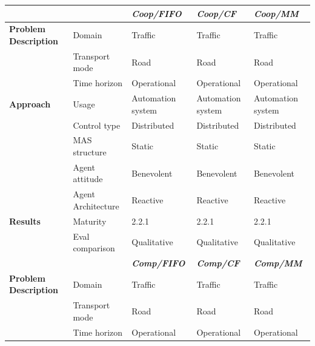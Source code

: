 \documentclass[11pt,letterpaper,onecolumn,twoside,openright,final]{report}
\begin{document}
\begin{table}[htbp]
\centering
\begin{tabular}{p{}p{}p{}p{}p{}}
    \addlinespace
        &       & \emph{\textbf{Coop/FIFO}} & \emph{\textbf{Coop/CF}} & \emph{\textbf{Coop/MM}} \\[0.2ex]
        \hline\hline
        \begin{minipage}[t]{2.3cm}\textbf{Problem \newline Description}\end{minipage} & Domain & Traffic & Traffic & Traffic \\
        \cline{2-5} & Transport mode & Road  & Road  & Road \\
        \cline{2-5} & Time horizon & Operational & Operational & Operational \\
        \hline
        \textbf{Approach} & Usage & Automation system & Automation system & Automation system \\
        \cline{2-5} & Control type & Distributed & Distributed & Distributed \\
        \cline{2-5} & MAS structure & Static & Static & Static \\
        \cline{2-5} & Agent attitude & Benevolent & Benevolent & Benevolent \\
        \cline{2-5} & \begin{minipage}[t]{2.3cm}Agent \newline Architecture\end{minipage} & Reactive & Reactive & Reactive \\[2.5ex]
        \hline
        \textbf{Results} & Maturity & 2.2.1 & 2.2.1 & 2.2.1 \\
        \cline{2-5} & Eval comparison & Qualitative & Qualitative & Qualitative \\[5ex]
        &       & \emph{\textbf{Comp/FIFO}} & \emph{\textbf{Comp/CF}} & \emph{\textbf{Comp/MM}} \\
        \hline\hline
        \begin{minipage}[t]{2.3cm}\textbf{Problem \newline Description}\end{minipage} & Domain & Traffic & Traffic & Traffic \\
        \cline{2-5} & Transport mode & Road  & Road  & Road \\
        \cline{2-5} & Time horizon & Operational & Operational & Operational \\

\end{tabular}
\end{table}
\end{document}
